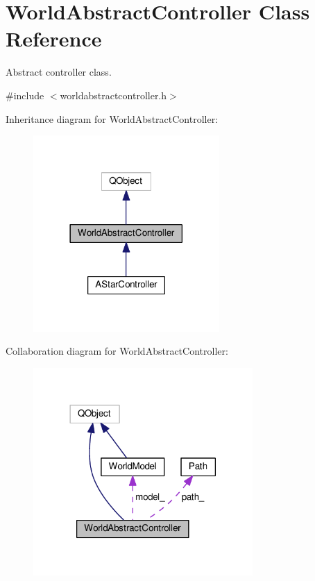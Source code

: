 \hypertarget{classWorldAbstractController}{}\section{World\+Abstract\+Controller Class Reference}
\label{classWorldAbstractController}


Abstract controller class.  




{\ttfamily \#include $<$worldabstractcontroller.\+h$>$}



Inheritance diagram for World\+Abstract\+Controller\+:\nopagebreak
\begin{figure}[H]
\begin{center}
\leavevmode
\includegraphics[width=201pt]{d9/d94/classWorldAbstractController__inherit__graph}
\end{center}
\end{figure}


Collaboration diagram for World\+Abstract\+Controller\+:\nopagebreak
\begin{figure}[H]
\begin{center}
\leavevmode
\includegraphics[width=237pt]{d1/d39/classWorldAbstractController__coll__graph}
\end{center}
\end{figure}
